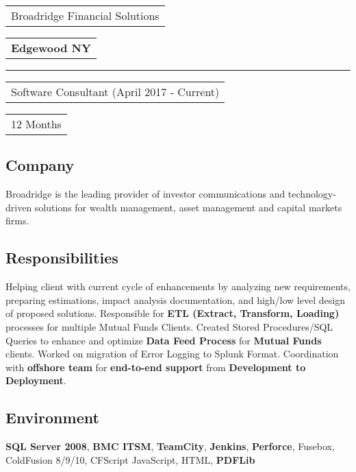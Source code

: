 \documentclass[letterpaper,10pt]{article}
\begin{document}

    \noindent
    \begin{tabular}[t]{@{}l}
    \Large{Broadridge Financial Solutions}
    \end{tabular}
    \hfill
    \begin{tabular}[t]{l@{}}
    \textbf{Edgewood NY}
    \end{tabular}
    \noindent\rule{\textwidth}{0.5pt}
    \begin{tabular}[t]{@{}l}
    Software Consultant (April 2017 - Current)
    \end{tabular}
    \hfill
    \begin{tabular}[t]{l@{}}
    12 Months
    \end{tabular}

    \subsection{Company}
    Broadridge is the leading provider of investor communications and technology-driven solutions for wealth management, asset management and capital markets firms.

    \subsection{Responsibilities}
    Helping client with current cycle of enhancements by analyzing new requirements, preparing estimations, impact analysis documentation, and high/low level design of proposed solutions. Responsible for \textbf{ETL (Extract, Transform, Loading)} processes for multiple Mutual Funds Clients. Created Stored Procedures/SQL Queries to enhance and optimize \textbf{Data Feed Process} for \textbf{Mutual Funds} clients. Worked on migration of Error Logging to Splunk Format. Coordination with \textbf{offshore team} for \textbf{end-to-end support} from \textbf{Development to Deployment}.

    \subsection{Environment}
    \textbf{SQL Server 2008}, \textbf{BMC ITSM}, \textbf{TeamCity}, \textbf{Jenkins}, \textbf{Perforce}, Fusebox,  ColdFusion 8/9/10, CFScript JavaScript, HTML, \textbf{PDFLib}

\end{document}
